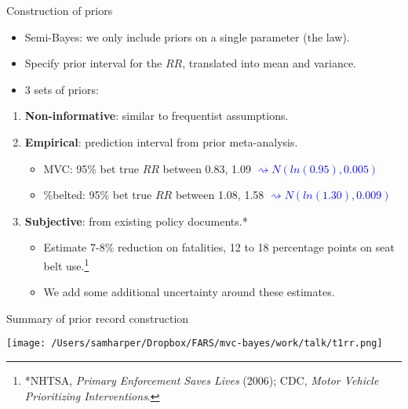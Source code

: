 \documentclass[english]{beamer}\usepackage[]{graphicx}\usepackage[]{color}
\begin{document}
\begin{frame}{Construction of priors}
\begin{itemize}
\item Semi-Bayes: we only include priors on a single parameter (the law).
\item Specify prior interval for the $RR$, translated into mean and variance.
\end{itemize}
\medskip{}

\begin{itemize}
\item 3 sets of priors:
\end{itemize}
\begin{enumerate}
\item<2-> \textbf{Non-informative}: similar to frequentist assumptions.\medskip{}
\item<3-> \textbf{Empirical}: prediction interval from prior meta-analysis.
\begin{itemize}
\item {\small{}MVC: 95\% bet true $RR$ between 0.83, 1.09 }\textcolor{blue}{\small{}$\rightsquigarrow N(ln(0.95),0.005)$}{\small \par}
\item {\small{}\%belted: 95\% bet true $RR$ between 1.08, 1.58 }\textcolor{blue}{\small{}$\rightsquigarrow N(ln(1.30),0.009)$}\medskip{}
\end{itemize}
\item<4-> \textbf{Subjective}: from existing policy documents.{*}
\begin{itemize}
\item Estimate 7-8\% reduction on fatalities, 12 to 18 percentage points
on seat belt use.\footnote{{*}NHTSA, \textit{Primary Enforcement Saves Lives} (2006); CDC, \textit{Motor
Vehicle Prioritizing Interventions}.}
\item We add some additional uncertainty around these estimates.
\end{itemize}
\end{enumerate}
\end{frame}
%
\begin{frame}{Summary of prior record construction}
\begin{center}
\texttt{[image: /Users/samharper/Dropbox/FARS/mvc-bayes/work/talk/t1rr.png]}
\par\end{center}

\end{frame}
\end{document}
